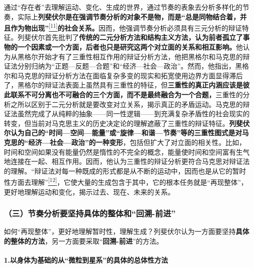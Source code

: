 \documentclass[UTF8, fontset = sourcesans, a4paper, oneside, zihao =
-4, scheme=chinese, no-math, space=true]{ctexbook}
\begin{document}
通过``存在者''去理解运动、变化、生成的世界，通过节奏的表象去分析多样化的节奏，实际上\textbf{列斐伏尔是在强调节奏分析的对象不是物，而是``总是同物结合着，并且作为物出现''}\protect\hypertarget{part0009_split_001.htmlux5cux23w11}{}{}\protect\hyperlink{part0009_split_004.htmlux5cux23m11}{\textsuperscript{{[}11{]}}}\textbf{的社会关系。}因而，他强调节奏分析必须具有三元分析的辩证特征。列斐伏尔首先批判了\textbf{传统的二元分析方法和结构主义方法，认为前者孤立了事物的一个因素或一个方面，后者也只是研究这两个对立面的关系和相互影响。}他认为从黑格尔开始才有了三重性相互作用的辩证分析方法，他把黑格尔和马克思的辩证法分别归纳为``正题---反题---合题''和``经济---社会---政治''。然而，他指出，黑格尔和马克思的辩证分析方法在面临复杂多变的现实和拓宽使用边界方面显得滞后了，黑格尔的辩证法表面上虽然具有三重性的特征，但\textbf{三重性的真正内涵应该是彼此联系不可分离也不可融合的三个方面，而不是最终融合为一个合题，}三重性的分析之所以区别于二元分析就是要改变对立关系，揭示真正的矛盾运动。马克思的辩证法虽然完成了从纯粹的抽象------同一性逻辑------到充满复杂矛盾性的社会现实的转变，但当前对马克思主义的历史决定论的理解遮蔽了三重性的辩证特征。\textbf{列斐伏尔认为自己的``时间---空间---能量''或``旋律---和谐---节奏''等的三重性图式是对马克思的``经济---社会---政治''的一种变形}，包括但扩大了对立面的相关性。比如，时间和空间如果没有能量仍然是惰性的不完全的概念，能量使时间和空间富有生气地连接在一起、相互作用。因而，他认为三重性的辩证分析更符合马克思对辩证法的理解。``辩证法对每一种既成的形式都是从不断的运动中，因而也是从它的暂时性方面去理解''\protect\hypertarget{part0009_split_001.htmlux5cux23w12}{}{}\protect\hyperlink{part0009_split_004.htmlux5cux23m12}{\textsuperscript{{[}12{]}}}，它使大量的生成包含于其中，它的根本任务就是``再现整体''，更好地理解运动和变化，揭示过去、现在、未来的关系。

\subsubsection{\texorpdfstring{（三）节奏分析要坚持具体的整体和``回溯-前进''}{（三）节奏分析要坚持具体的整体和回溯-前进}}\label{part0009_split_001.htmlux5cux23d029}

如何``再现整体''，更好地理解暂时性，理解生成？列斐伏尔认为一方面要坚持\textbf{具体的整体的方法}，另一方面要采取``\textbf{回溯-前进}''的方法。

\paragraph{\texorpdfstring{1.以身体为基础的从``微粒到星系''的具体的总体性方法}{1.以身体为基础的从微粒到星系的具体的总体性方法}}\label{part0009_split_001.htmlux5cux23e006}
\end{document}
